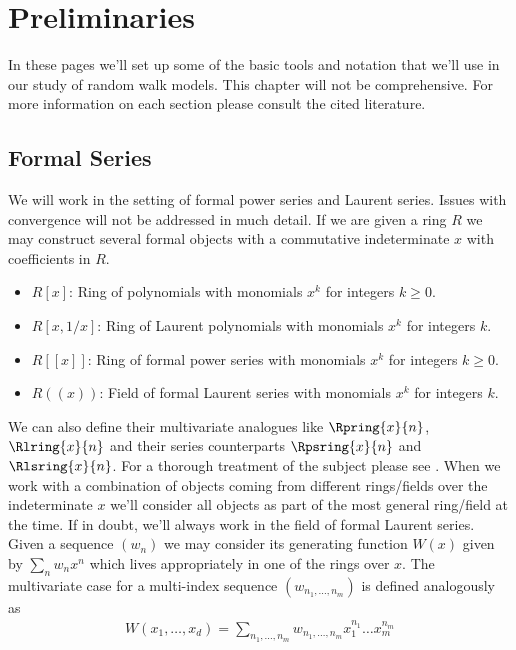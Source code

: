 
\chapter{Preliminaries}
\label{ch:Preliminaries}
In these pages we'll set up some of the basic tools and notation that we'll use in our study of random walk models. This chapter will not be comprehensive. For more information on each section please consult the cited literature.

\section{Formal Series}
We will work in the setting of formal power series and Laurent series. Issues with convergence will not be addressed in much detail. If we are given a ring $R$ we may construct several formal objects with a commutative indeterminate $x$ with coefficients in $R$.
\begin{itemize}
\item $R[x]$: Ring of polynomials with monomials $x^k$ for integers $k\ge 0$.
\item $R[x,1/x]$: Ring of Laurent polynomials with monomials $x^k$ for integers $k$.
\item $R[[x]]$: Ring of formal power series with monomials $x^k$ for integers $k \ge 0$.
\item $R((x))$: Field of formal Laurent series with monomials $x^k$ for integers $k$.
\end{itemize}
We can also define their multivariate analogues like $\Rpring{x}{n}$, $\Rlring{x}{n}$ and their series counterparts $\Rpsring{x}{n}$ and $\Rlsring{x}{n}$. For a thorough treatment of the subject please see \cite{monforte2013formal}. When we work with a combination of objects coming from different rings/fields over the indeterminate $x$ we'll consider all objects as part of the most general ring/field at the time. If in doubt, we'll always work in the field of formal Laurent series. Given a sequence $(w_n)$ we may consider its generating function $W(x)$ given by $\sum_{n} w_n x^n$ which lives appropriately in one of the rings over $x$. The multivariate case for a multi-index sequence $(w_{n_1,\ldots,n_m})$ is defined analogously as
\begin{align}
	W(x_1,\ldots,x_d) = \sum_{n_1,\ldots,n_m} w_{n_1,\ldots,n_m} x_1^{n_1}\ldots x_m^{n_m}
\end{align}

